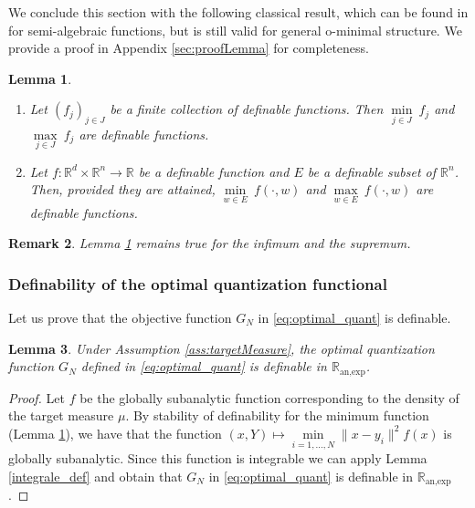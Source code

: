 \documentclass[11pt]{article}
\newcommand{\1}{\mathbbm{1}}
\newtheorem{lem}{Lemma}[section]
\newtheorem{rem}[lem]{Remark}
\numberwithin{equation}{section}
\begin{document}
We conclude this section with the following classical result, which can be found in \cite[page 395]{ioffe2017variational} for semi-algebraic functions, but is still valid for general o-minimal structure. We provide a proof in Appendix \ref{sec:proofLemma} for completeness.

\begin{lem}\label{minmax} \hfill
\begin{enumerate}
    \item[(i)] Let $(f_{j})_{j\in J}$ be a finite collection of definable functions. Then $\underset{j\in J}{\min}\: f_{j}$ and $\underset{j\in J}{\max}\: f_{j}$ are definable functions. 
    \item[(ii)] Let $f:\mathbb{R}^{d}\times \mathbb{R}^{n}\longrightarrow \mathbb{R}$ be a definable function and $E$ be a definable subset of $\mathbb{R}^{n}$. Then, provided they are attained, $\underset{w\in E}{\min}\: f(\cdot,w)$ and $\underset{w\in E}{\max}\: f(\cdot,w)$ are definable functions.
\end{enumerate}
\end{lem}
\begin{rem}\label{rem_sup-inf}  
	Lemma \ref{minmax} remains true for the infimum and the supremum.
\end{rem}
\subsubsection{Definability of the optimal quantization functional}

Let us prove that the objective function $G_N$ in \eqref{eq:optimal_quant} is definable.


\begin{lem}\label{lem_G_definable}
	Under Assumption \ref{ass:targetMeasure},
	the optimal quantization function $G_{N}$ defined in \eqref{eq:optimal_quant} is definable in  $\mathbb{R}_{\text{an,exp}}$.
\end{lem}

\begin{proof}
	Let $f$ be the globally subanalytic function corresponding to the density of the target measure $\mu$. By stability of definability for the minimum function (Lemma \ref{minmax}), we have that the function $(x,Y)\mapsto \underset{i=1,\ldots,N}{\min}\|x-y_{i}\|^{2}f(x)$ is globally subanalytic. Since this function is integrable we can apply Lemma \ref{integrale_def} and obtain that $G_{N}$ in \eqref{eq:optimal_quant} is definable in  $\mathbb{R}_{\text{an,exp}}$.
\end{proof}
\end{document}
